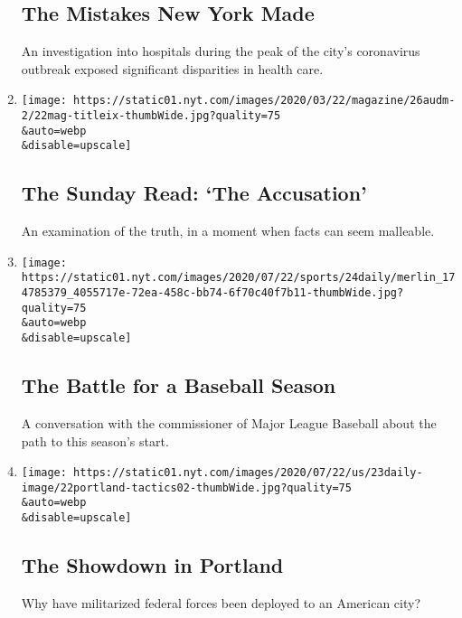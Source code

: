 \begin{enumerate}
  \hypertarget{the-mistakes-new-york-made}{%
  \subsection{The Mistakes New York
  Made}\label{the-mistakes-new-york-made}}

  An investigation into hospitals during the peak of the city's
  coronavirus outbreak exposed significant disparities in health care.
\item
  \href{/2020/07/26/podcasts/the-daily/the-accusation-the-sunday-read.html}{}

  \texttt{[image: https://static01.nyt.com/images/2020/03/22/magazine/26audm-2/22mag-titleix-thumbWide.jpg?quality=75\\\&auto=webp\\\&disable=upscale]}

  \hypertarget{the-sunday-read-the-accusation}{%
  \subsection{The Sunday Read: `The
  Accusation'}\label{the-sunday-read-the-accusation}}

  An examination of the truth, in a moment when facts can seem
  malleable.
\item
  \href{/2020/07/24/podcasts/the-daily/mlb-baseball-season-coronavirus.html}{}

  \texttt{[image: https://static01.nyt.com/images/2020/07/22/sports/24daily/merlin\_174785379\_4055717e-72ea-458c-bb74-6f70c40f7b11-thumbWide.jpg?quality=75\\\&auto=webp\\\&disable=upscale]}

  \hypertarget{the-battle-for-a-baseball-season}{%
  \subsection{The Battle for a Baseball
  Season}\label{the-battle-for-a-baseball-season}}

  A conversation with the commissioner of Major League Baseball about
  the path to this season's start.
\item
  \href{/2020/07/23/podcasts/the-daily/portland-protests.html}{}

  \texttt{[image: https://static01.nyt.com/images/2020/07/22/us/23daily-image/22portland-tactics02-thumbWide.jpg?quality=75\\\&auto=webp\\\&disable=upscale]}

  \hypertarget{the-showdown-in-portland}{%
  \subsection{The Showdown in Portland}\label{the-showdown-in-portland}}

  Why have militarized federal forces been deployed to an American city?
\end{enumerate}

